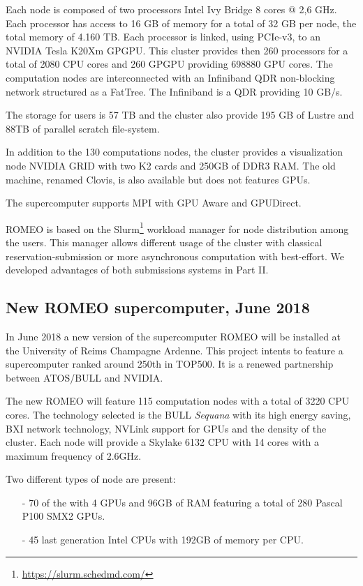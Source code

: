 Each node is composed of two processors Intel Ivy Bridge 8 cores @ 2,6 GHz. 
Each processor has access to 16 GB of memory for a total of 32 GB per node, the total memory of 4.160 TB. 
Each processor is linked, using PCIe-v3, to an NVIDIA Tesla K20Xm GPGPU. 
This cluster provides then 260 processors for a total of 2080 CPU cores and 260 GPGPU providing 698880 GPU cores. 
The computation nodes are interconnected with an Infiniband QDR non-blocking network structured as a FatTree. 
The Infiniband is a QDR providing 10 GB/s. 

The storage for users is 57 TB and the cluster also provide 195 GB of Lustre and 88TB of parallel scratch file-system. 

In addition to the 130 computations nodes, the cluster provides a visualization node NVIDIA GRID with two K2 cards and 250GB of DDR3 RAM. 
The old machine, renamed Clovis, is also available but does not features GPUs. 

The supercomputer supports MPI with GPU Aware and GPUDirect. 

ROMEO is based on the Slurm\footnote{\url{https://slurm.schedmd.com/}} workload manager for node distribution among the users. 
This manager allows different usage of the cluster with classical reservation-submission or more asynchronous computation with best-effort. 
We developed advantages of both submissions systems in Part II. 

\subsection{New ROMEO supercomputer, June 2018}

In June 2018 a new version of the supercomputer ROMEO will be installed at the University of Reims Champagne Ardenne. 
This project intents to feature a supercomputer ranked around 250th in TOP500. 
It is a renewed partnership between ATOS/BULL and NVIDIA. 

The new ROMEO will feature 115 computation nodes with a total of 3220 CPU cores. 
The technology selected is the BULL \textit{Sequana} with its high energy saving, BXI network technology, NVLink support for GPUs and the density of the cluster. 
Each node will provide a Skylake 6132 CPU with 14 cores with a maximum frequency of 2.6GHz.

Two different types of node are present: 
\begin{itemize}[noitemsep,nolistsep]
\item[-] 70 of the with 4 GPUs and 96GB of RAM featuring a total of 280 Pascal P100 SMX2 GPUs.
\item[-] 45 last generation Intel CPUs with 192GB of memory per CPU. 
\end{itemize}

